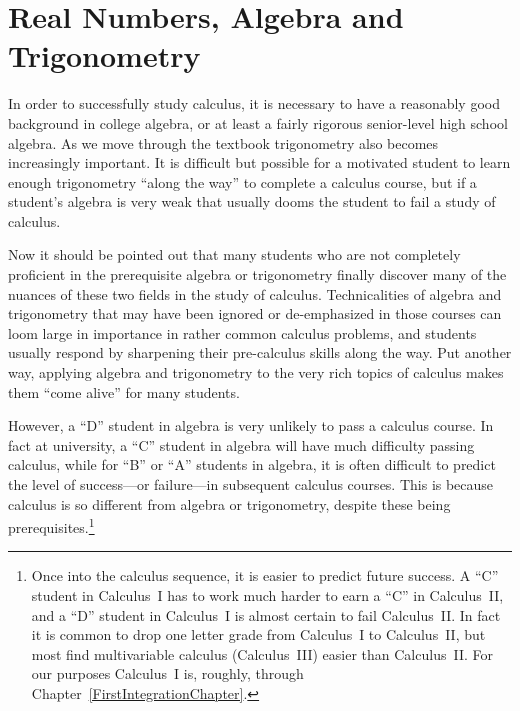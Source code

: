 \chapter{Real Numbers, Algebra and Trigonometry\label{RealsChapter}}
In order to successfully
study calculus, it is necessary to have a reasonably good
background in college algebra, or
at least a fairly rigorous senior-level high school algebra.
As we move through the textbook trigonometry also becomes
increasingly important.  It is difficult but possible 
for a motivated student to learn enough
trigonometry ``along the way'' to complete a calculus course,
but if a student's algebra is very weak that usually dooms the student
to fail a study of calculus.

Now it should be pointed out that many students who are not
completely proficient in the prerequisite
algebra or trigonometry finally
discover many of the nuances of these two fields in the study
of calculus.  
Technicalities of algebra and trigonometry
that may have been ignored or de-emphasized in those courses
can loom large in importance in rather common calculus problems,
and students usually respond by sharpening their pre-calculus skills
along the way.  
Put another way, applying algebra and trigonometry to the very
rich topics of calculus makes them
``come alive'' for many students. 


However, a ``D'' student in algebra is very unlikely to pass a calculus
course.  In fact at university, a ``C'' student in algebra
will have much difficulty passing  calculus, while for ``B'' or ``A'' 
students in algebra, it is often difficult to predict the level of
success---or failure---in subsequent calculus courses.
This is because calculus is so different from algebra or
trigonometry, despite these being prerequisites.\footnote{%
Once into the calculus sequence, it is easier to predict
future success.
A ``C'' student in Calculus~I has to work much harder to
earn a ``C'' in Calculus~II, and a ``D'' student in Calculus~I
is almost certain to fail Calculus~II.  In fact it is common
to drop one letter grade from Calculus~I to Calculus~II, but
most find multivariable calculus (Calculus~III) easier than
Calculus~II.  For our purposes Calculus~I is, roughly, through 
Chapter~\ref{FirstIntegrationChapter}.%
}

